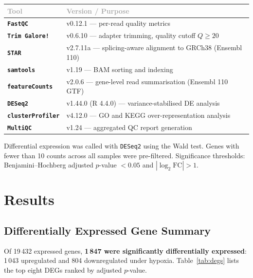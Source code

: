 \documentclass[11pt, a4paper]{article}
\newcommand{\tool}[1]{\texttt{#1}}
\begin{document}
\setlength{\parskip}{0pt}
\begin{tabularx}{\linewidth}{@{}>{\color{teal}\bfseries}l@{\hspace{8mm}}>{\raggedright\arraybackslash}X@{}}
\toprule
\textcolor{darkgrey}{Tool} & \textcolor{darkgrey}{Version / Purpose} \\
\midrule
\tool{FastQC}         & v0.12.1 --- per-read quality metrics \\
\tool{Trim Galore!}   & v0.6.10 --- adapter trimming, quality cutoff $Q\ge20$ \\
\tool{STAR}           & v2.7.11a --- splicing-aware alignment to GRCh38 (Ensembl 110) \\
\tool{samtools}       & v1.19 --- BAM sorting and indexing \\
\tool{featureCounts}  & v2.0.6 --- gene-level read summarisation (Ensembl 110 GTF) \\
\tool{DESeq2}         & v1.44.0 (R 4.4.0) --- variance-stabilised DE analysis \\
\tool{clusterProfiler}& v4.12.0 --- GO and KEGG over-representation analysis \\
\tool{MultiQC}        & v1.24 --- aggregated QC report generation \\
\bottomrule
\end{tabularx}
\setlength{\parskip}{5pt}

\vspace{4pt}

Differential expression was called with \tool{DESeq2} using the Wald test.
Genes with fewer than 10 counts across all samples were pre-filtered. Significance
thresholds: Benjamini--Hochberg adjusted $p$-value $<0.05$ and $|\log_2\text{FC}|>1$.

\section{Results}

\subsection{Differentially Expressed Gene Summary}

Of 19\,432 expressed genes, \textbf{1\,847 were significantly differentially
expressed}: 1\,043 upregulated and 804 downregulated under hypoxia.
Table~\ref{tab:degs} lists the top eight DEGs ranked by adjusted $p$-value.
\end{document}
